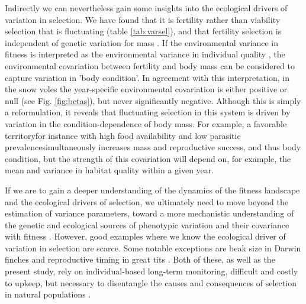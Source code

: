 Indirectly we can nevertheless gain some insights into the ecological drivers of variation in selection. We have found that it is fertility rather than viability  selection that is fluctuating (table \ref{tab:varsel}), and that fertility selection is independent of genetic variation for mass \parencite{Bonnet2016}. If the environmental variance in fitness is interpreted as the environmental variance in individual quality \parencite[see][for a discussion of individual quality in an evolutionary context]{Wilson2010a}, the environmental covariation between fertility and body mass can be considered to capture variation in 'body condition'. In agreement with this interpretation, in the snow voles the year-specific environmental covariation is either positive or null (see Fig. \ref{fig:betas}), but never significantly negative. Although this is simply a reformulation, it reveals that fluctuating selection in this system is driven by variation in the condition-dependence of body mass. For example, a favorable territory\textemdash for instance with high food availability and low parasitic prevalence\textemdash simultaneously increases mass and reproductive success, and thus body condition, but the strength of this covariation will depend on, for example, the mean and variance in habitat quality within a given year.

If we are to gain a deeper understanding of the dynamics of the fitness landscape and the ecological drivers of selection, we ultimately need to move beyond the estimation of variance parameters, toward a more mechanistic understanding of the genetic and ecological sources of phenotypic variation and their covariance with fitness \parencite{Morrissey2012flusel}. However, good examples where we know the ecological driver of variation in selection are scarce. Some notable exceptions are beak size in Darwin finches \parencite{Grant2002} and reproductive timing in great tits \parencite{Husby2011}. Both of these, as well as the present study, rely on individual-based long-term monitoring, difficult and costly to upkeep, but necessary to disentangle the causes and consequences of selection in natural populations \parencite{Clutton-brock2010}. 

